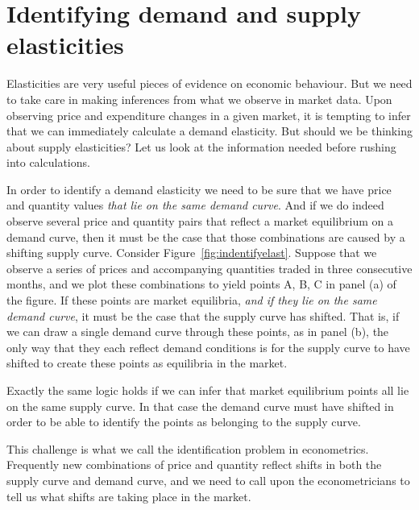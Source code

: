 \section{Identifying demand and supply elasticities}\label{sec:ch4sec8}

Elasticities are very useful pieces of evidence on economic behaviour. But we need to take care in making inferences from what we observe in market data. Upon observing price and expenditure changes in a given market, it is tempting to infer that we can immediately calculate a demand elasticity.  But should we be thinking about supply elasticities? Let us look at the information needed before rushing into calculations. 

In order to identify a demand elasticity we need to be sure that we have price and quantity values \textit{that lie on the same demand curve}. And if we do indeed observe several price and quantity pairs that reflect a market equilibrium on a demand curve, then it must be the case that those combinations are caused by a shifting supply curve. Consider Figure~\ref{fig:indentifyelast}. Suppose that we observe a series of prices and accompanying quantities traded in three consecutive months, and we plot these combinations to yield points A, B, C in panel (a) of the figure. If these points are market equilibria, \textit{and if they lie on the same demand curve}, it must be the case that the supply curve has shifted. That is, if we can draw a single demand curve through these points, as in panel (b), the only way that they each reflect demand conditions is for the supply curve to have shifted to create these points as equilibria in the market. 



Exactly the same logic holds if we can infer that market equilibrium points all lie on the same supply curve. In that case the demand curve must have shifted in order to be able to identify the points as belonging to the supply curve. 

This challenge is what we call the identification problem in econometrics. Frequently new combinations of price and quantity reflect shifts in both the supply curve and demand curve, and we need to call upon the econometricians to tell us what shifts are taking place in the market.
